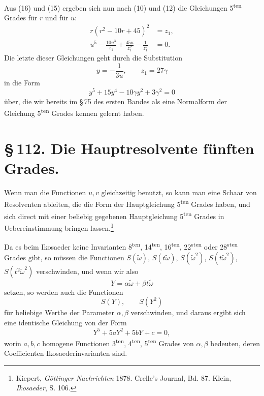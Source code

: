 \documentclass[11pt]{article}
\begin{document}
Aus (16) und (15) ergeben sich nun nach (10) und (12) die Gleichungen 5\textsuperscript{ten} Grades für \(r\) und für \(u\):
\begin{align}
r(r^2-10r+45)^2&=z_1,\tag{17}\\
u^5-\frac{10u^3}{z_1}+\frac{45u}{z_1^2}-\frac{1}{z_1^2}&=0.\tag{18}
\end{align}
Die letzte dieser Gleichungen geht durch die Substitution
\begin{equation}
y=-\frac{1}{3u},\qquad z_1=27\gamma
\tag{19}
\end{equation}
in die Form
\begin{equation}
y^5+15y^4-10\gamma y^2+3\gamma^2=0
\tag{20}
\end{equation}
über, die wir bereits im \S\,75 des ersten Bandes als eine Normalform der Gleichung 5\textsuperscript{ten} Grades kennen gelernt haben.

\section*{\S\,112. Die Hauptresolvente fünften Grades.}

Wenn man die Functionen \(u,v\) gleichzeitig benutzt, so kann man eine Schaar von Resolventen ableiten, die die Form der Hauptgleichung 5\textsuperscript{ten} Grades haben, und sich direct mit einer beliebig gegebenen Hauptgleichung 5\textsuperscript{ten} Grades in Uebereinstimmung bringen lassen.\footnote{Kiepert, \emph{Göttinger Nachrichten} 1878. Crelle's Journal, Bd. 87. Klein, \emph{Ikosaeder}, S. 106.}

Da es beim Ikosaeder keine Invarianten 8\textsuperscript{ten}, 14\textsuperscript{ten}, 16\textsuperscript{ten}, 22\textsuperscript{sten} oder 28\textsuperscript{sten} Grades gibt, so müssen die Functionen \(S(\tilde\omega)\), \(S(t\tilde\omega)\), \(S(\tilde\omega^2)\), \(S(t\tilde\omega^2)\), \(S(t^2\tilde\omega^2)\) verschwinden, und wenn wir also
\begin{equation}
Y=\alpha\tilde\omega+\beta t\tilde\omega
\tag{1}
\end{equation}
setzen, so werden auch die Functionen
\[
S(Y),\qquad S(Y^2)
\]
für beliebige Werthe der Parameter \(\alpha,\beta\) verschwinden, und daraus ergibt sich eine identische Gleichung von der Form
\begin{equation}
Y^5+5aY^2+5bY+c=0,
\tag{2}
\end{equation}
worin \(a,b,c\) homogene Functionen 3\textsuperscript{ten}, 4\textsuperscript{ten}, 5\textsuperscript{ten} Grades von \(\alpha,\beta\) bedeuten, deren Coefficienten Ikosaederinvarianten sind.
\end{document}
